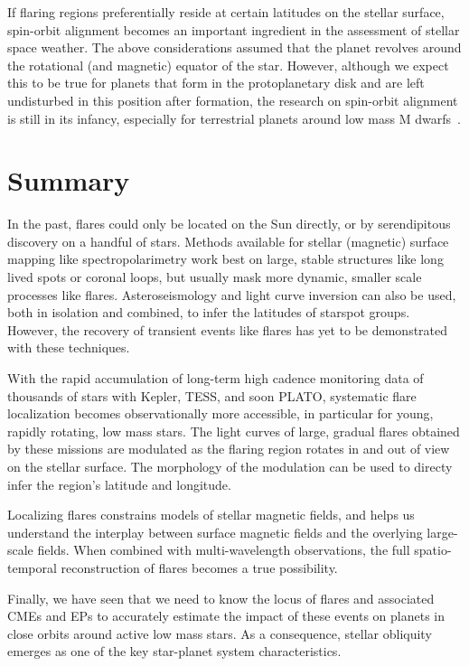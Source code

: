 \documentclass[proof]{WileyASNA-v1}
\begin{document}
If flaring regions preferentially reside at certain latitudes on the stellar surface, spin-orbit alignment becomes an important ingredient in the assessment of stellar space weather. 
The above considerations assumed that the planet revolves around the rotational (and magnetic) equator of the star.
However, although we expect this to be true for planets that form in the protoplanetary disk and are left undisturbed in this position after formation, the research on spin-orbit alignment is still in its infancy, especially for terrestrial planets around low mass M dwarfs~\citep{mazeh2015,hirano2020,stefansson2020}.

\section{Summary}\label{sec:summary}
In the past, flares could only be located on the Sun directly, or by serendipitous discovery on a handful of stars. 
Methods available for stellar (magnetic) surface mapping like spectropolarimetry work best on large, stable structures like long lived spots or coronal loops, but usually mask more dynamic, smaller scale processes like flares. 
Asteroseismology and light curve inversion can also be used, both in isolation and combined, to infer the latitudes of starspot groups. However, the recovery of transient events like flares has yet to be demonstrated with these techniques.

With the rapid accumulation of long-term high cadence monitoring data of thousands of stars with Kepler, TESS, and soon PLATO, systematic flare localization becomes observationally more accessible, in particular for young, rapidly rotating, low mass stars.
The light curves of large, gradual flares obtained by these missions are modulated as the flaring region rotates in and out of view on the stellar surface. The morphology of the modulation can be used to directy infer the region's latitude and longitude.

Localizing flares constrains models of stellar magnetic fields, and helps us understand the interplay between surface magnetic fields and the overlying large-scale fields. When combined with multi-wavelength observations, the full spatio-temporal reconstruction of flares becomes a true possibility.

Finally, we have seen that we need to know the locus of flares and associated CMEs and EPs to accurately estimate the impact of these events on planets in close orbits around active low mass stars. As a consequence, stellar obliquity emerges as one of the key star-planet system characteristics.
\end{document}
